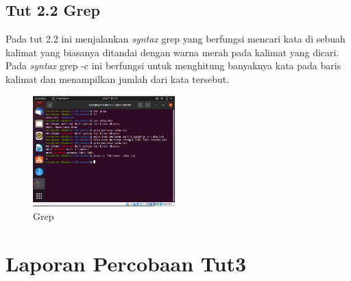 \documentclass[11pt,a4paper]{article}
\begin{document}
\subsection{Tut 2.2 Grep}
    Pada tut 2.2 ini menjalankan \textit{syntax} grep yang berfungsi mencari kata di sebuah kalimat yang biasanya ditandai dengan warna merah pada kalimat yang dicari. Pada \textit{syntax} grep -c ini berfungsi untuk menghitung banyaknya kata pada baris kalimat dan menampilkan jumlah dari kata tersebut.
    \begin{figure}[h]
    \centering
    \includegraphics[width=0.5\textwidth]{Gambar/tut 2.2 grep.png}
    \caption{Grep}
    \label{fig:my_label}
    \end{figure}
    
\section{Laporan Percobaan Tut3}
\end{document}
